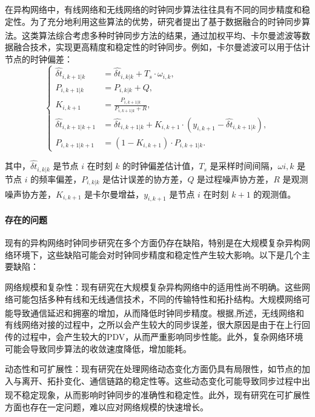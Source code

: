 \documentclass[UTF8,a4paper,12pt]{ctexart}
\numberwithin{equation}{section}
\begin{document}
在异构网络中，有线网络和无线网络的时钟同步算法往往具有不同的同步精度和稳定性。为了充分地利用这些算法的优势，研究者提出了基于数据融合的时钟同步算法\textsuperscript{\cite{anees2020hesitant}}。这类算法综合考虑多种时钟同步方法的结果，通过加权平均、卡尔曼滤波等数据融合技术，实现更高精度和稳定性的时钟同步。例如，卡尔曼滤波可以用于估计节点的时钟偏差：
\begin{equation}
	\left\{
	\begin{aligned}
		\hat{\delta t}_{i,k+1|k} &= \hat{\delta t}_{i,k|k} + T_s \cdot \omega_{i,k},\\
		P_{i,k+1|k} &= P_{i,k|k} + Q,\\
		K_{i,k+1} &= \frac{P_{i,k+1|k}}{P_{i,k+1|k} + R},\\
		\hat{\delta t}_{i,k+1|k+1} &= \hat{\delta t}_{i,k+1|k} + K_{i,k+1} \cdot (y_{i,k+1} - \hat{\delta t}_{i,k+1|k}),\\
		P_{i,k+1|k+1} &= (1 - K_{i,k+1}) \cdot P_{i,k+1|k}.
	\end{aligned}
	\right.
\end{equation}

其中，$\hat{\delta t}_{i,k|k}$ 是节点 $i$ 在时刻 $k$ 的时钟偏差估计值，$T_s$ 是采样时间间隔，$\omega{i,k}$ 是节点 $i$ 的频率偏差，$P_{i,k|k}$ 是估计误差的协方差，$Q$ 是过程噪声协方差，$R$ 是观测噪声协方差，$K_{i,k+1}$ 是卡尔曼增益，$y_{i,k+1}$ 是节点 $i$ 在时刻 $k+1$ 的观测值\textsuperscript{\cite{grewal2020kalman}}。


\paragraph{存在的问题}现有的异构网络时钟同步研究在多个方面仍存在缺陷，特别是在大规模复杂异构网络环境下，这些缺陷可能会对时钟同步精度和稳定性产生较大影响。以下是几个主要缺陷：

网络规模和复杂性：现有研究在大规模复杂异构网络中的适用性尚不明确。这些网络可能包括多种有线和无线通信技术，不同的传输特性和拓扑结构。大规模网络可能导致通信延迟和拥塞的增加，从而降低时钟同步精度\textsuperscript{\cite{rinaldi2016time}}。根据\cite{chaloupka2014clock},\cite{johannessen2004time}所述，无线网络和有线网络对接的过程中，之所以会产生较大的同步误差，很大原因是由于在上行回传的过程中，会产生较大的PDV，从而严重影响同步性能。此外，复杂网络环境可能会导致同步算法的收敛速度降低，增加能耗。

动态性和可扩展性：现有研究在处理网络动态变化方面仍具有局限性，如节点的加入与离开、拓扑变化、通信链路的稳定性等。这些动态变化可能导致同步过程中出现不稳定现象，从而影响时钟同步的准确性和稳定性\textsuperscript{\cite{qiu2017heterogeneous}}。此外，现有研究在可扩展性方面也存在一定问题，难以应对网络规模的快速增长。
\end{document}
